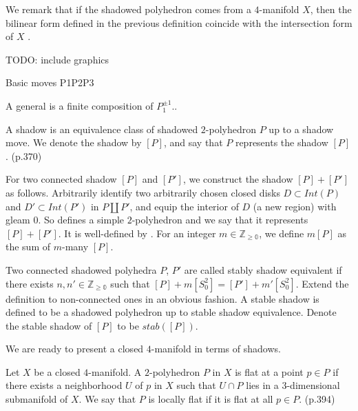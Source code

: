 \noindent We remark that if the shadowed polyhedron comes from a
$4$-manifold $X$, then the bilinear form defined in the previous
definition coincide with the intersection form of $X$
\cite[section IX.5]{turaev-qiok-3-manifolds}.

\begin{definition}\label{def/shadow-moves}

  TODO: include graphics

  Basic moves P1P2P3

  A general is a finite composition of $P_1^{\pm 1}$..
\end{definition}

\begin{definition}[shadow]\label{def/shadow}
  A shadow is an equivalence class of shadowed $2$-polyhedron $P$
  up to a shadow move. We denote the shadow by $[P]$, and say
  that $P$ represents the shadow $[P]$. (p.370)
\end{definition}

\noindent For two connected shadow $[P]$ and $[P']$, we construct
the shadow $[P]+[P']$ as follows. Arbitrarily identify two
arbitrarily chosen closed disks $D \subset Int(P)$ and
$D' \subset Int(P')$ in $P \coprod P'$, and equip the interior of
$D$ (a new region) with gleam $0$. So defines a simple
$2$-polyhedron and we say that it represents $[P]+[P']$. It is
well-defined by \cite[lemma VIII.2.1.1]{turaev-qiok-3-manifolds}.
For an integer $m \in \mathbb{Z_{\geq 0}}$, we define $m[P]$ as
the sum of $m$-many $[P]$.

\begin{definition}\label{def/stable-shadow}
  Two connected shadowed polyhedra $P$, $P'$ are called stably
  shadow equivalent if there exists
  $n, n' \in \mathbb{Z_{\geq 0}}$ such that
  $[P] + m[S^{2}_{0}] = [P'] + m'[S^{2}_{0}]$. Extend the
  definition to non-connected ones in an obvious fashion. A
  stable shadow is defined to be a shadowed polyhedron up to
  stable shadow equivalence. Denote the stable shadow of $[P]$ to
  be $stab([P])$.
\end{definition}

\noindent We are ready to present a closed $4$-manifold in terms
of shadows.

\begin{definition}\label{def/locally-flat-2-polyhedron-in-a-4-manifold}
  Let $X$ be a closed $4$-manifold. A $2$-polyhedron $P$ in $X$
  is flat at a point $p \in P$ if there exists a neighborhood $U$
  of $p$ in $X$ such that $U \cap P$ lies in a $3$-dimensional
  submanifold of $X$. We say that $P$ is locally flat if it is
  flat at all $p \in P$. (p.394)
\end{definition}

